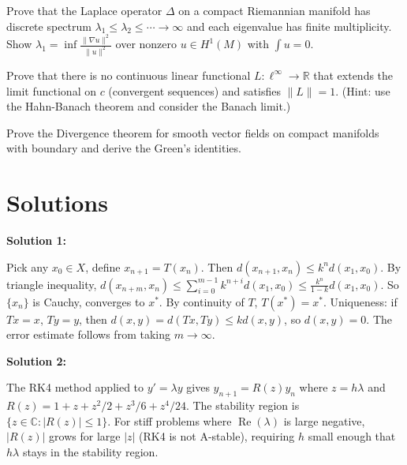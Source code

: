 \documentclass[12pt,a4paper]{exam}
\begin{document}
\begin{questions}
\vspace{0.3cm}

\question[3]
Prove that the Laplace operator $\Delta$ on a compact Riemannian manifold has discrete spectrum $\lambda_1 \leq \lambda_2 \leq \cdots \to \infty$ and each eigenvalue has finite multiplicity. Show $\lambda_1 = \inf \frac{\|\nabla u\|^2}{\|u\|^2}$ over nonzero $u \in H^1(M)$ with $\int u = 0$.

\vspace{0.3cm}

\question[6]
Prove that there is no continuous linear functional $L: \ell^\infty \to \mathbb{R}$ that extends the limit functional on $c$ (convergent sequences) and satisfies $\|L\| = 1$. (Hint: use the Hahn-Banach theorem and consider the Banach limit.)

\vspace{0.3cm}

\question[3]
Prove the Divergence theorem for smooth vector fields on compact manifolds with boundary and derive the Green's identities.

\vspace{0.3cm}

\end{questions}

\newpage
\section*{Solutions}

\textbf{Solution 1:}

Pick any $x_0 \in X$, define $x_{n+1} = T(x_n)$. Then $d(x_{n+1}, x_n) \leq k^n d(x_1, x_0)$. By triangle inequality, $d(x_{n+m}, x_n) \leq \sum_{i=0}^{m-1} k^{n+i} d(x_1, x_0) \leq \frac{k^n}{1-k} d(x_1, x_0)$. So $\{x_n\}$ is Cauchy, converges to $x^*$. By continuity of $T$, $T(x^*) = x^*$. Uniqueness: if $Tx=x$, $Ty=y$, then $d(x,y) = d(Tx,Ty) \leq k d(x,y)$, so $d(x,y)=0$. The error estimate follows from taking $m \to \infty$.

\vspace{0.5cm}

\textbf{Solution 2:}

The RK4 method applied to $y' = \lambda y$ gives $y_{n+1} = R(z) y_n$ where $z = h\lambda$ and $R(z) = 1 + z + z^2/2 + z^3/6 + z^4/24$. The stability region is $\{z \in \mathbb{C}: |R(z)| \leq 1\}$. For stiff problems where $\operatorname{Re}(\lambda)$ is large negative, $|R(z)|$ grows for large $|z|$ (RK4 is not A-stable), requiring $h$ small enough that $h\lambda$ stays in the stability region.
\end{document}
